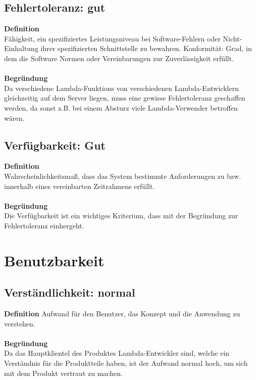 \documentclass[a4paper,20pt,oneside]{book}
\begin{document}
\subsection{Fehlertoleranz: gut}

\textbf{Definition} \\
Fähigkeit, ein spezifiziertes Leistungsniveau bei Software-Fehlern oder Nicht-Einhaltung ihrer spezifizierten Schnittstelle zu bewahren.
Konformität: Grad, in dem die Software Normen oder Vereinbarungen zur Zuverlässigkeit erfüllt. \\ \\
\textbf{Begründung} \\
Da verschiedene \glspl{Lambda-Funktion} von verschiedenen \gls{Lambda-Entwickler}n gleichzeitig auf dem Server liegen, muss eine gewisse Fehlertoleranz geschaffen werden, da sonst z.B. bei einem Absturz viele \gls{Lambda-Verwender} betroffen wären.

\subsection{Verfügbarkeit: Gut}

\textbf{Definition} \\
Wahrscheinlichkeitsmaß, dass das System bestimmte Anforderungen zu bzw. innerhalb eines vereinbarten Zeitrahmens erfüllt.\\ \\
\textbf{Begründung} \\
Die Verfügbarkeit ist ein wichtiges Kriterium, dass mit der Begründung zur Fehlertoleranz einhergeht.
\\
\section{Benutzbarkeit}

\subsection{Verständlichkeit: normal}

\textbf{Definition} Aufwand für den Benutzer, das Konzept und die Anwendung zu verstehen. \\ \\
\textbf{Begründung} \\
Da das Hauptklientel des Produktes \gls{Lambda-Entwickler} sind, welche ein Verständnis für die Produktteile haben, ist der Aufwand normal hoch, um sich mit dem Produkt vertraut zu machen.
\end{document}
